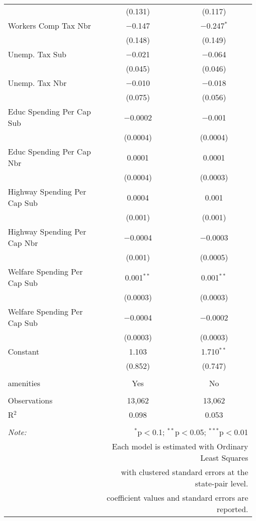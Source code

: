 \begin{table}[!htbp]
\begin{tabular}{@{\extracolsep{5pt}}lcc}
  & (0.131) & (0.117) \\ 
  Workers Comp Tax Nbr & $-$0.147 & $-$0.247$^{*}$ \\ 
  & (0.148) & (0.149) \\ 
  Unemp. Tax Sub & $-$0.021 & $-$0.064 \\ 
  & (0.045) & (0.046) \\ 
  Unemp. Tax Nbr & $-$0.010 & $-$0.018 \\ 
  & (0.075) & (0.056) \\ 
  Educ Spending Per Cap Sub & $-$0.0002 & $-$0.001 \\ 
  & (0.0004) & (0.0004) \\ 
  Educ Spending Per Cap Nbr & 0.0001 & 0.0001 \\ 
  & (0.0004) & (0.0003) \\ 
  Highway Spending Per Cap Sub & 0.0004 & 0.001 \\ 
  & (0.001) & (0.001) \\ 
  Highway Spending Per Cap Nbr & $-$0.0004 & $-$0.0003 \\ 
  & (0.001) & (0.0005) \\ 
  Welfare Spending Per Cap Sub & 0.001$^{**}$ & 0.001$^{**}$ \\ 
  & (0.0003) & (0.0003) \\ 
  Welfare Spending Per Cap Sub & $-$0.0004 & $-$0.0002 \\ 
  & (0.0003) & (0.0003) \\ 
  Constant & 1.103 & 1.710$^{**}$ \\ 
  & (0.852) & (0.747) \\ 
 \hline \\[-1.8ex] 
amenities & Yes & No \\ 
\hline \\[-1.8ex] 
Observations & 13,062 & 13,062 \\ 
R$^{2}$ & 0.098 & 0.053 \\ 
\hline 
\hline \\[-1.8ex] 
\textit{Note:}  & \multicolumn{2}{r}{$^{*}$p$<$0.1; $^{**}$p$<$0.05; $^{***}$p$<$0.01} \\ 
 & \multicolumn{2}{r}{Each model is estimated with Ordinary Least Squares} \\ 
 & \multicolumn{2}{r}{with clustered standard errors at the state-pair level.} \\ 
 & \multicolumn{2}{r}{coefficient values and standard errors are reported.} \\ 
\end{tabular} 
\end{table} 
